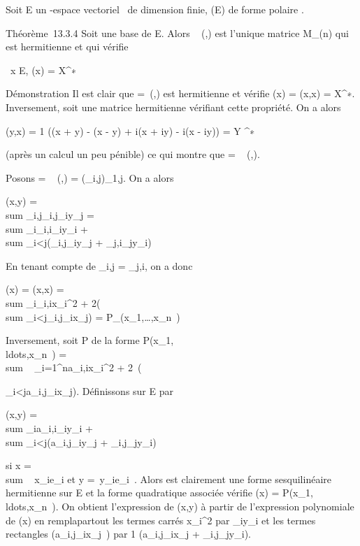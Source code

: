 \documentclass[]{article}
\begin{document}
Soit E un -espace vectoriel ~de dimension finie, \Phi \inQ(E) de forme
polaire \phi.

Théorème~13.3.4 Soit  une base de E. Alors
\mathrmMat~ (\phi,) est
l'unique matrice \Omega \in M_(n) qui est hermitienne et qui vérifie

\forall~x \in E, \Phi(x) = X^∗~\OmegaX

Démonstration Il est clair que \Omega =\
\mathrmMat (\Phi,) est hermitienne et vérifie \Phi(x) =
\phi(x,x) = X^∗\OmegaX. Inversement, soit \Omega une matrice hermitienne
vérifiant cette propriété. On a alors

\phi(y,x) = 1  (\Phi(x + y) - \Phi(x - y) + i\Phi(x + iy)
- i\Phi(x - iy)) = Y ^∗\OmegaX

(après un calcul un peu pénible) ce qui montre que \Omega
= \mathrmMat~ (\phi,).

Posons \Omega = \mathrmMat~ (\phi,)
= (\omega_i,j)_1\leqi,j\leqn. On a alors

\phi(x,y) = \\sum
_i,j\omega_i,j\overlinex_iy_j
= \\sum
_i\omega_i,i\overlinex_iy_i
+ \\sum
_i<j(\omega_i,j\overlinex_iy_j
+ \omega_j,i\overlinex_jy_i)

En tenant compte de \omega_i,j =
\overline\omega_j,i, on a donc

\Phi(x) = \phi(x,x) = \\sum
_i\omega_i,ix_i^2 +
2\mathrmRe(\\sum
_i<j\omega_i,j\overlinex_ix_j)
=
P_\Phi(x_1,\ldots,x_n~)

Inversement, soit P de la forme
P(x_1,\\ldots,x_n~)
= \\sum ~
_i=1^na_i,ix_i^2
+
2\mathrmRe~(\\\sum

_i<ja_i,j\overlinex_ix_j).
Définissons \phi sur E par

\phi(x,y) = \\sum
_ia_i,i\overlinex_iy_i
+ \\sum
_i<j(a_i,j\overlinex_iy_j
+
\overlinea_i,j\overlinex_jy_i)

si x = \\sum ~
x_ie_i et y =\
\sum  y_ie_i~. Alors \phi est
clairement une forme sesquilinéaire hermitienne sur E et la forme
quadratique associée vérifie \Phi(x) =
P(x_1,\\ldots,x_n~).
On obtient l'expression de \phi(x,y) à partir de l'expression polynomiale
de \Phi(x) en rempla\ccant partout les termes carrés
x_i^2 par
\overlinex_iy_i et les termes
rectangles
\mathrmRe(a_i,j\overlinex_ix_j~)
par  1 
(a_i,j\overlinex_ix_j +
\overlinea_i,j\overlinex_jy_i).
\end{document}
